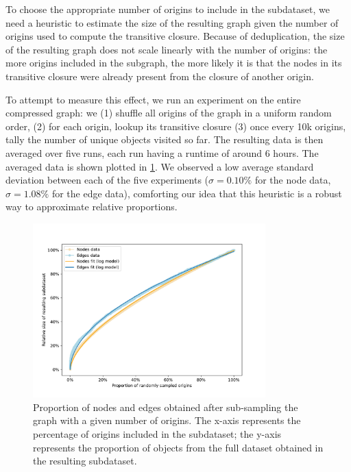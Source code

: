 To choose the appropriate number of origins to include in the subdataset, we
need a heuristic to estimate the size of the resulting graph given the number
of origins used to compute the transitive closure. Because of deduplication,
the size of the resulting graph does not scale linearly with the number of
origins: the more origins included in the subgraph, the more likely it is that
the nodes in its transitive closure were already present from the closure of
another origin.

To attempt to measure this effect, we run an experiment on the entire
compressed graph: we (1) shuffle all origins of the graph in a uniform
random order, (2) for each origin, lookup its transitive closure (3) once every
10k origins, tally the number of unique objects visited so far. The resulting
data is then averaged over five runs, each run having a runtime of around 6
hours.  The averaged data is shown plotted in
\cref{fig:subdataset-size-function}. We observed a low average standard
deviation between each of the five experiments ($\sigma = 0.10\%$ for the node
data, $\sigma = 1.08\%$ for the edge data), comforting our idea that this
heuristic is a robust way to approximate relative proportions.

\begin{figure}
    \centering
    \includegraphics[width=0.8\textwidth]{img/graph-exploitation/subdataset_size_function_fit}
    \caption{Proportion of nodes and edges obtained after sub-sampling the
        graph with a given number of origins. The x-axis represents the
        percentage of origins included in the subdataset; the y-axis represents
        the proportion of objects from the full dataset obtained in the
    resulting subdataset.}%
    \label{fig:subdataset-size-function}
\end{figure}

